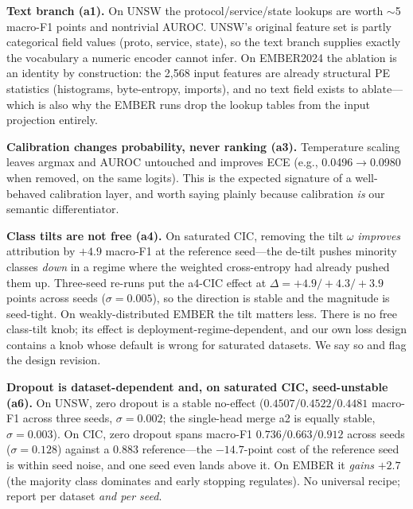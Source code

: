 \documentclass[sigconf,anonymous=false]{acmart}
\begin{document}
\textbf{Text branch (a1).} On UNSW the protocol/service/state lookups are worth $\sim$5 macro-F1 points and nontrivial AUROC. UNSW's original feature set is partly categorical field values (proto, service, state), so the text branch supplies exactly the vocabulary a numeric encoder cannot infer. On EMBER2024 the ablation is an identity by construction: the 2{,}568 input features are already structural PE statistics (histograms, byte-entropy, imports), and no text field exists to ablate---which is also why the EMBER runs drop the lookup tables from the input projection entirely.

\textbf{Calibration changes probability, never ranking (a3).} Temperature scaling leaves argmax and AUROC untouched and improves ECE (e.g., 0.0496$\to$0.0980 when removed, on the same logits). This is the expected signature of a well-behaved calibration layer, and worth saying plainly because calibration \emph{is} our semantic differentiator.

\textbf{Class tilts are not free (a4).} On saturated CIC, removing the tilt $\omega$ \emph{improves} attribution by $+4.9$ macro-F1 at the reference seed---the de-tilt pushes minority classes \emph{down} in a regime where the weighted cross-entropy had already pushed them up. Three-seed re-runs put the a4-CIC effect at $\Delta=+4.9/+4.3/+3.9$ points across seeds ($\sigma{=}0.005$), so the direction is stable and the magnitude is seed-tight. On weakly-distributed EMBER the tilt matters less. There is no free class-tilt knob; its effect is deployment-regime-dependent, and our own loss design contains a knob whose default is wrong for saturated datasets. We say so and flag the design revision.

\textbf{Dropout is dataset-dependent and, on saturated CIC, seed-unstable (a6).} On UNSW, zero dropout is a stable no-effect ($0.4507/0.4522/0.4481$ macro-F1 across three seeds, $\sigma{=}0.002$; the single-head merge a2 is equally stable, $\sigma{=}0.003$). On CIC, zero dropout spans macro-F1 $0.736/0.663/0.912$ across seeds ($\sigma{=}0.128$) against a $0.883$ reference---the $-14.7$-point cost of the reference seed is within seed noise, and one seed even lands above it. On EMBER it \emph{gains} $+2.7$ (the majority class dominates and early stopping regulates). No universal recipe; report per dataset \emph{and per seed}.
\end{document}
